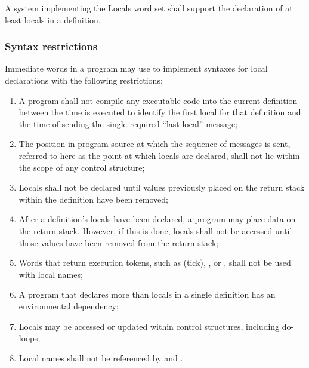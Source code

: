 A system implementing the Locals word set shall support the
declaration of at least  locals in a definition.


\subsubsection{Syntax restrictions} %
\label{locals:rules}

Immediate words in a program may use  to implement
syntaxes for local declarations with the following restrictions:

\begin{enumerate}
\item A program shall not compile any executable code into the
	current definition between the time  is executed
	to identify the first local for that definition and the time of
	sending the single required ``last local'' message;

\item The position in program source at which the sequence of
	 messages is sent, referred to here as the point
	at which locals are declared, shall not lie within the scope of
	any control structure;

\item Locals shall not be declared until values previously placed on
	the return stack within the definition have been removed;

\item After a definition's locals have been declared, a program may
	place data on the return stack. However, if this is done,
	locals shall not be accessed until those values have been
	removed from the return stack;

\item Words that return execution tokens, such as 
	(tick), \word[core]{[']}, or , shall not be
	used with local names;

\item A program that declares more than  locals in a single
	definition has an environmental dependency;

\item Locals may be accessed or updated within control structures,
	including do-loops;

\item Local names shall not be referenced by 
	and \word[core]{[COMPILE]}.
\end{enumerate}

